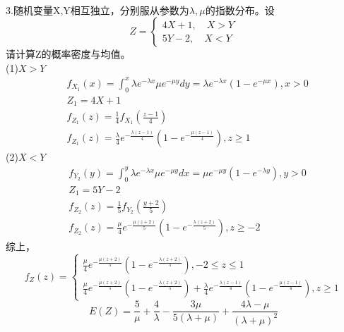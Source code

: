 \documentclass[UTF8]{ctexart}
\begin{document}
\paragraph{}
3.随机变量X,Y相互独立，分别服从参数为$\lambda, \mu$的指数分布。设
\begin{equation*}
Z= \begin{cases}
4X+1,\quad X>Y \\
5Y-2,\quad X<Y
\end{cases}
\end{equation*}
请计算Z的概率密度与均值。\\
(1)$X>Y$
\begin{equation*}
\begin{aligned}
&f_{X_1}(x)=\int_0^x{\lambda e^{-\lambda x}\mu e^{-\mu y}dy}=\lambda e^{-\lambda x}(1-e^{-\mu x}) ,x>0\\
&Z_1=4X+1 \\
&f_{Z_1}(z)=\frac{1}{4}f_{X_1}(\frac{z-1}{4}) \\
&f_{Z_1}(z)=\frac{\lambda}{4}e^{-\frac{\lambda (z-1)}{4}}(1-e^{-\frac{\mu (z-1)}{4}}) , z \geq 1
\end{aligned}
\end{equation*}
(2)$X<Y$
\begin{equation*}
\begin{aligned}
&f_{Y_2}(y)=\int_0^y{\lambda e^{-\lambda x}\mu e^{-\mu y}dx}=\mu e^{-\mu y}(1-e^{-\lambda y}) ,y>0\\
&Z_1=5Y-2 \\
&f_{Z_2}(z)=\frac{1}{5}f_{Y_2}(\frac{y+2}{5}) \\
&f_{Z_2}(z)=\frac{\mu}{4}e^{-\frac{\mu (z+2)}{5}}(1-e^{-\frac{\lambda (z+2)}{5}}) , z \geq -2
\end{aligned}
\end{equation*}
综上，
\begin{equation*}
f_Z(z)=\begin{cases}
\frac{\mu}{4}e^{-\frac{\mu (z+2)}{5}}(1-e^{-\frac{\lambda (z+2)}{5}}) ,-2\leq z\leq 1 \\
\frac{\mu}{4}e^{-\frac{\mu (z+2)}{5}}(1-e^{-\frac{\lambda (z+2)}{5}})+\frac{\lambda}{4}e^{-\frac{\lambda (z-1)}{4}}(1-e^{-\frac{\mu (z-1)}{4}}) , z \geq 1
\end{cases}
\end{equation*}
\begin{equation*}
E(Z)=\frac{5}{\mu}+\frac{4}{\lambda}-\frac{3\mu}{5(\lambda + \mu)}+\frac{4\lambda -\mu}{(\lambda + \mu)^2}
\end{equation*}
\end{document}
